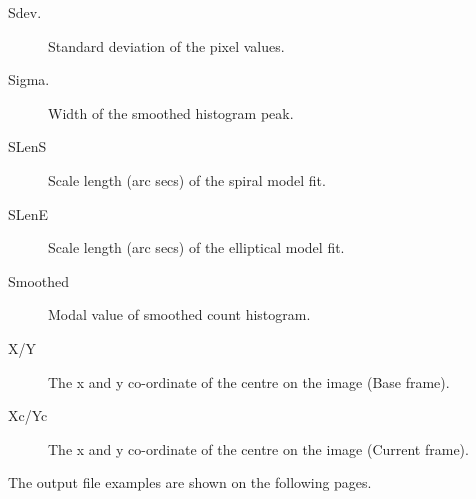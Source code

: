 \documentclass[twoside,11pt]{starlink}
\begin{document}
\begin{description}
\item[Sdev.]Standard deviation of the pixel values.
\item[Sigma.]Width of the smoothed histogram peak.
\item[SLenS]Scale length (arc secs) of the spiral model fit.
\item[SLenE]Scale length (arc secs) of the elliptical model fit.
\item[Smoothed]Modal value of smoothed count histogram.
\item[X/Y]The x and y co-ordinate of the centre on the image (Base frame).
\item[Xc/Yc]The x and y co-ordinate of the centre on the image (Current frame).
\end{description}

The output file examples are shown on the following pages.
\end{document}
